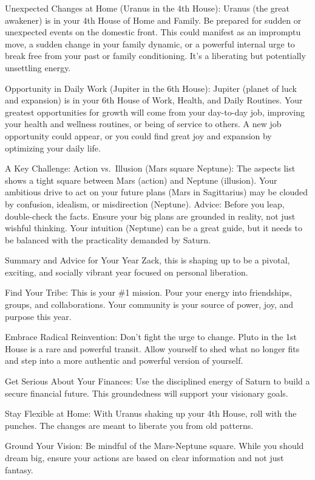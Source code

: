 \documentclass{article}
\begin{document}
Unexpected Changes at Home (Uranus in the 4th House): Uranus (the great awakener) is in your 4th House of Home and Family. Be prepared for sudden or unexpected events on the domestic front. This could manifest as an impromptu move, a sudden change in your family dynamic, or a powerful internal urge to break free from your past or family conditioning. It's a liberating but potentially unsettling energy.

Opportunity in Daily Work (Jupiter in the 6th House): Jupiter (planet of luck and expansion) is in your 6th House of Work, Health, and Daily Routines. Your greatest opportunities for growth will come from your day-to-day job, improving your health and wellness routines, or being of service to others. A new job opportunity could appear, or you could find great joy and expansion by optimizing your daily life.

A Key Challenge: Action vs.~Illusion (Mars square Neptune): The aspects list shows a tight square between Mars (action) and Neptune (illusion). Your ambitious drive to act on your future plans (Mars in Sagittarius) may be clouded by confusion, idealism, or misdirection (Neptune). Advice: Before you leap, double-check the facts. Ensure your big plans are grounded in reality, not just wishful thinking. Your intuition (Neptune) can be a great guide, but it needs to be balanced with the practicality demanded by Saturn.

Summary and Advice for Your Year Zack, this is shaping up to be a pivotal, exciting, and socially vibrant year focused on personal liberation.

Find Your Tribe: This is your \#1 mission. Pour your energy into friendships, groups, and collaborations. Your community is your source of power, joy, and purpose this year.

Embrace Radical Reinvention: Don't fight the urge to change. Pluto in the 1st House is a rare and powerful transit. Allow yourself to shed what no longer fits and step into a more authentic and powerful version of yourself.

Get Serious About Your Finances: Use the disciplined energy of Saturn to build a secure financial future. This groundedness will support your visionary goals.

Stay Flexible at Home: With Uranus shaking up your 4th House, roll with the punches. The changes are meant to liberate you from old patterns.

Ground Your Vision: Be mindful of the Mars-Neptune square. While you should dream big, ensure your actions are based on clear information and not just fantasy.
\end{document}
